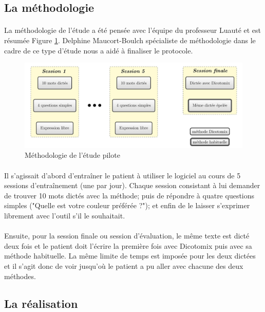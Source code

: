 \documentclass[11pt,a4paper]{article}
\theoremstyle{plain}
\theoremstyle{definition}
\begin{document}
\subsection{La méthodologie}

\paragraph{} La méthodologie de l'étude a été pensée avec l'équipe du professeur Luauté et est résumée Figure \ref{etude}. Delphine Maucort-Boulch spécialiste de méthodologie 
dans le cadre de ce type d'étude nous a aidé à finaliser le protocole.

\begin{figure}[h!]
\centering
\includegraphics[width=16cm]{images/schemaEtudePilote.jpg}
\caption{Méthodologie de l'étude pilote}
\label{etude}
\end{figure}

\paragraph{} Il s'agissait d'abord d'entraîner le patient à utiliser le logiciel au cours de 5 sessions d'entraînement (une par jour). Chaque session consistant à lui demander de trouver 10 mots dictés avec la méthode; puis de répondre à quatre questions simples ("Quelle est votre couleur préférée ?"); et 
enfin de le laisser s'exprimer librement avec l'outil s'il le souhaitait.
\paragraph{} Ensuite, pour la session finale ou session d'évaluation, le même texte est dicté deux fois et le patient doit l'écrire la première fois avec Dicotomix puis avec sa méthode habituelle. La même limite de temps est imposée pour les deux dictées et il s'agit donc de voir jusqu'où le patient a pu aller avec chacune des 
deux méthodes.


\subsection{La réalisation}
\end{document}
